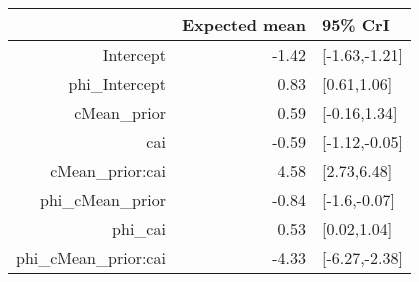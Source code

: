 \begin{tabular}{rrl}
  \hline
 & Expected mean & 95\% CrI \\ 
  \hline
Intercept & -1.42 & [-1.63,-1.21] \\ 
  phi\_Intercept & 0.83 & [0.61,1.06] \\ 
  cMean\_prior & 0.59 & [-0.16,1.34] \\ 
  cai & -0.59 & [-1.12,-0.05] \\ 
  cMean\_prior:cai & 4.58 & [2.73,6.48] \\ 
  phi\_cMean\_prior & -0.84 & [-1.6,-0.07] \\ 
  phi\_cai & 0.53 & [0.02,1.04] \\ 
  phi\_cMean\_prior:cai & -4.33 & [-6.27,-2.38] \\ 
   \hline
\end{tabular}

